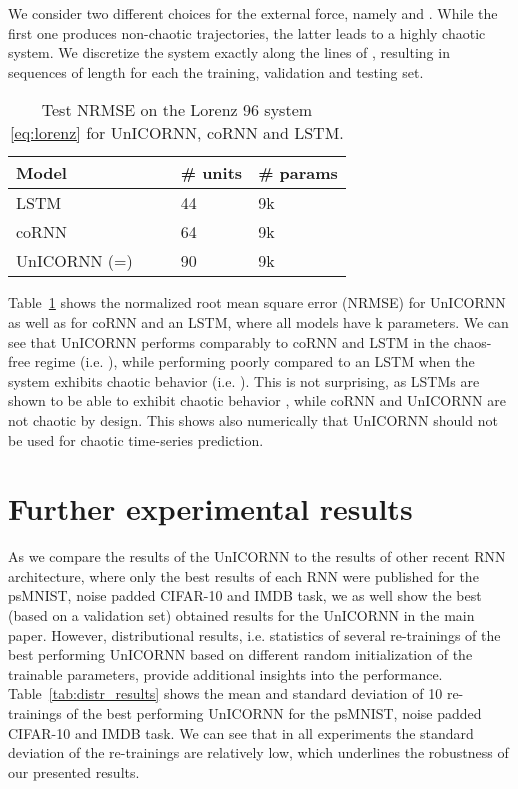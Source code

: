 \documentclass{article}
\newcommand{\Tref}[1]{Table~\ref{#1}}
\begin{document}
We consider two different choices for the external force, namely  and . While the first one produces non-chaotic trajectories, the latter leads to a highly chaotic system. We discretize the system exactly along the lines of \cite{coRNN}, resulting in  sequences of length  for each the training, validation and testing set.
\begin{table}[h!]
  \caption{Test NRMSE on the Lorenz 96 system \eqref{eq:lorenz} for UnICORNN, coRNN and LSTM.}
  \label{tab:lorenz}
  \centering
  \begin{tabular}{lllll}
    \toprule
    \cmidrule(r){1-5}
    Model &  &  & \# units & \# params \\
        \midrule
    LSTM \cite{coRNN} & &  & 44 & 9k\\
    coRNN \cite{coRNN} &  &  & 64 & 9k\\
    UnICORNN (=) &  &  & 90 & 9k\\
    \bottomrule
  \end{tabular}
\end{table}
\Tref{tab:lorenz} shows the normalized root mean square error (NRMSE) for UnICORNN as well as for coRNN and an LSTM, where all models have k parameters. We can see that UnICORNN performs comparably to coRNN and LSTM in the chaos-free regime (i.e. ), while performing poorly compared to an LSTM when the system exhibits chaotic behavior (i.e. ). This is not surprising, as LSTMs are shown to be able to exhibit chaotic behavior \citep{chaotic_lstm}, while coRNN and UnICORNN are not chaotic by design.
This shows also numerically that UnICORNN should not be used for chaotic time-series prediction.

\section{Further experimental results}
As we compare the results of the UnICORNN to the results of other recent RNN architecture, where only the best results of each RNN were published for the psMNIST, noise padded CIFAR-10 and IMDB task, we as well show the best (based on a validation set) obtained results for the UnICORNN in the main paper. However, distributional results, i.e. statistics of several re-trainings of the best performing UnICORNN based on different random initialization of the trainable parameters, provide additional insights into the performance. \Tref{tab:distr_results} shows the mean and standard deviation of 10 re-trainings of the best performing UnICORNN for the psMNIST, noise padded CIFAR-10 and IMDB task. We can see that in all experiments the standard deviation of the re-trainings are relatively low, which underlines the robustness of our presented results. 
\end{document}
